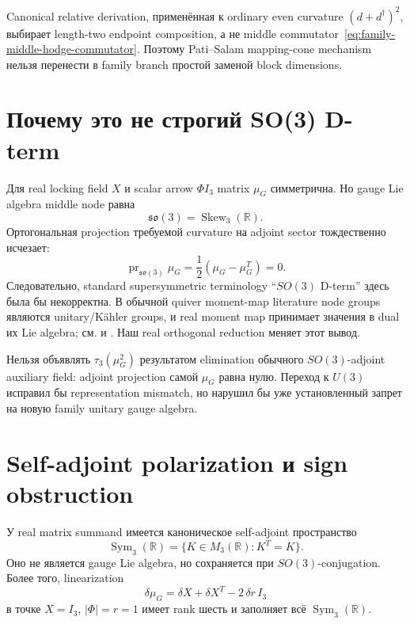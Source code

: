 \begin{nogocriterion}
Canonical relative derivation, применённая к ordinary even curvature
\((d+d^\dagger)^2\), выбирает length-two endpoint composition, а не
middle commutator~\eqref{eq:family-middle-hodge-commutator}. Поэтому
Pati--Salam mapping-cone mechanism нельзя перенести в family branch простой
заменой block dimensions.
\end{nogocriterion}

\section{Почему это не строгий SO(3) D-term}

Для real locking field \(X\) и scalar arrow \(\Phi I_3\) matrix
\(\mu_G\) симметрична. Но gauge Lie algebra middle node равна
\begin{equation}
 \mathfrak{so}(3)=\operatorname{Skew}_3(\mathbb R).
\end{equation}
Ортогональная projection требуемой curvature на adjoint sector тождественно
исчезает:
\begin{equation}
 \operatorname{pr}_{\mathfrak{so}(3)}\mu_G
 =\frac12(\mu_G-\mu_G^T)=0.
 \label{eq:family-so3-dterm-zero}
\end{equation}
Следовательно, standard supersymmetric terminology ``\(SO(3)\) D-term''
здесь была бы некорректна. В обычной quiver moment-map literature node
groups являются unitary/Kähler groups, и real moment map принимает значения
в dual их Lie algebra; см.  и
. Наш real orthogonal reduction меняет этот вывод.

\begin{nogocriterion}
Нельзя объявлять \(\tau_3(\mu_G^2)\) результатом elimination обычного
\(SO(3)\)-adjoint auxiliary field: adjoint projection самой \(\mu_G\)
равна нулю. Переход к \(U(3)\) исправил бы representation mismatch, но
нарушил бы уже установленный запрет на новую family unitary gauge algebra.
\end{nogocriterion}

\section{Self-adjoint polarization и sign obstruction}

У real matrix summand имеется каноническое self-adjoint пространство
\begin{equation}
 \operatorname{Sym}_3(\mathbb R)
 =\{K\in M_3(\mathbb R):K^T=K\}.
\end{equation}
Оно не является gauge Lie algebra, но сохраняется при
\(SO(3)\)-conjugation. Более того, linearization
\begin{equation}
 \delta\mu_G
 =\delta X+\delta X^T-2\,\delta r\,I_3
\end{equation}
в точке \(X=I_3\), \(|\Phi|=r=1\) имеет rank шесть и заполняет всё
\(\operatorname{Sym}_3(\mathbb R)\).

